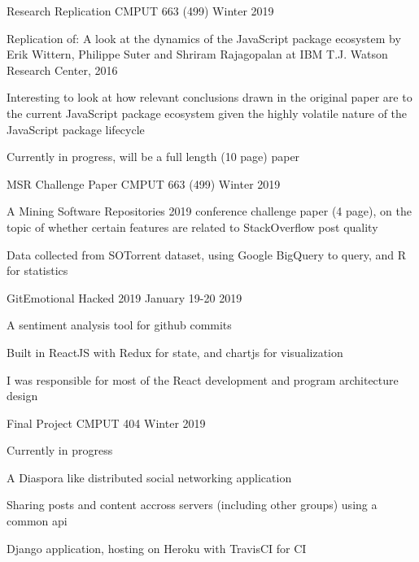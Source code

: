 
\begin{cventries}
  \cventry
    {}
    {Research Replication}
    {CMPUT 663 (499)}
    {Winter 2019}
    {
      \begin{cvitems}
      \item {Replication of: A look at the dynamics of the JavaScript package ecosystem by Erik Wittern, Philippe Suter 
        and Shriram Rajagopalan at IBM T.J. Watson Research Center, 2016}
      \item {Interesting to look at how relevant conclusions drawn in the original paper are to the current JavaScript package 
        ecosystem given the highly volatile nature of the JavaScript package lifecycle}
      \item {Currently in progress, will be a full length (10 page) paper}
      \end{cvitems}
    }

  \cventry
    {}
    {MSR Challenge Paper}
    {CMPUT 663 (499)}
    {Winter 2019}
    {
      \begin{cvitems} %
      \item {A Mining Software Repositories 2019 conference challenge paper (4 page), on the topic of whether certain features are
        related to StackOverflow post quality}
      \item {Data collected from SOTorrent dataset, using Google BigQuery to query, and R for statistics}
      \end{cvitems}
    }

  \cventry
    {}
    {GitEmotional}
    {Hacked 2019}
    {January 19-20 2019}
    {
      \begin{cvitems}
      \item {A sentiment analysis tool for github commits}
      \item {Built in ReactJS with Redux for state, and chartjs for visualization}
      \item {I was responsible for most of the React development and program architecture design}
      \end{cvitems}
    }

  \cventry
    {}
    {Final Project}
    {CMPUT 404}
    {Winter 2019}
    {
      \begin{cvitems}
      \item Currently in progress
      \item A Diaspora like distributed social networking application
      \item Sharing posts and content accross servers (including other groups) using a common api
      \item Django application, hosting on Heroku with TravisCI for CI
      \end{cvitems}
    }


\end{cventries}
